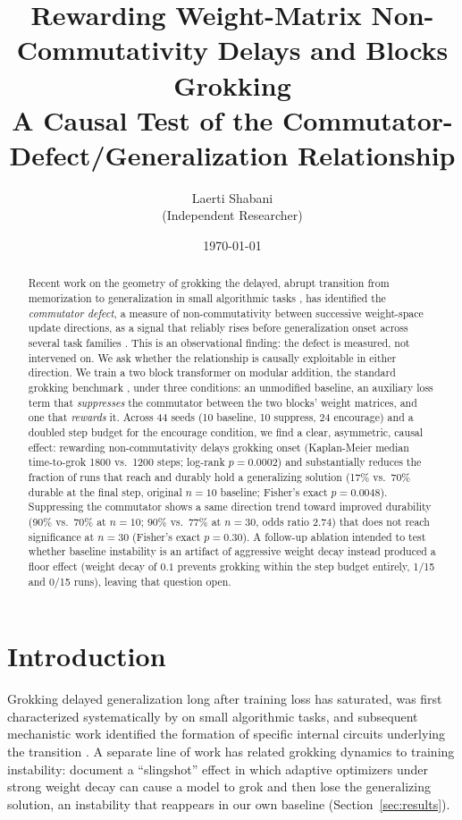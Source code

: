 \documentclass[11pt]{article}
\title{Rewarding Weight-Matrix Non-Commutativity Delays and Blocks Grokking\\
\large A Causal Test of the Commutator-Defect/Generalization Relationship}
\author{Laerti Shabani \\ \small (Independent Researcher)}
\date{\today}
\begin{document}
\maketitle

\begin{abstract}
Recent work on the geometry of grokking the delayed, abrupt transition
from memorization to generalization in small algorithmic tasks
\citep{power2022grokking}, has identified the \emph{commutator defect}, a
measure of non-commutativity between successive weight-space update
directions, as a signal that reliably rises before generalization onset
across several task families \citep{xu2026a,xu2026b}. This is an
observational finding: the defect is measured, not intervened on. We ask
whether the relationship is causally exploitable in either direction. We
train a two block transformer on modular addition, the standard grokking
benchmark \citep{power2022grokking}, under three conditions: an unmodified
baseline, an auxiliary loss term that \emph{suppresses} the commutator
between the two blocks' weight matrices, and one that \emph{rewards} it.
Across 44 seeds (10 baseline, 10 suppress, 24 encourage) and a doubled step
budget for the encourage condition, we find a clear, asymmetric, causal
effect: rewarding non-commutativity delays grokking onset (Kaplan-Meier
median time-to-grok 1800 vs.\ 1200 steps; log-rank $p=0.0002$) and
substantially reduces the fraction of runs that reach and durably hold a
generalizing solution (17\% vs.\ 70\% durable at the final step, original
$n{=}10$ baseline; Fisher's exact $p=0.0048$). Suppressing the commutator shows a same direction trend
toward improved durability (90\% vs.\ 70\% at $n{=}10$; 90\% vs.\ 77\% at
$n{=}30$, odds ratio 2.74) that does not reach significance at $n=30$
(Fisher's exact $p=0.30$). A follow-up ablation intended to test whether
baseline instability is an artifact of aggressive weight decay instead
produced a floor effect (weight decay of $0.1$ prevents grokking within the
step budget entirely, 1/15 and 0/15 runs), leaving that question open.
\end{abstract}

\section{Introduction}

Grokking delayed generalization long after training loss has saturated,
was first characterized systematically by \citet{power2022grokking} on
small algorithmic tasks, and subsequent mechanistic work identified the
formation of specific internal circuits underlying the transition
\citep{nanda2023progress}. A separate line of work has related grokking
dynamics to training instability: \citet{thilak2022slingshot} document a
``slingshot'' effect in which adaptive optimizers under strong weight
decay can cause a model to grok and then lose the generalizing solution,
an instability that reappears in our own baseline (Section~\ref{sec:results}).
\end{document}
